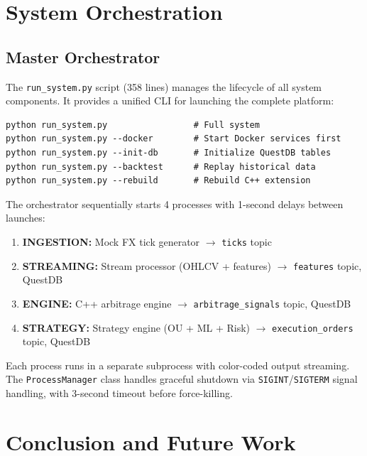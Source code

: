 \documentclass[letterpaper,11pt]{report}
\begin{document}
\chapter{System Orchestration}

\section{Master Orchestrator}

The \texttt{run\_system.py} script (358 lines) manages the lifecycle of all system components. It provides a unified CLI for launching the complete platform:

\begin{verbatim}
python run_system.py                 # Full system
python run_system.py --docker        # Start Docker services first
python run_system.py --init-db       # Initialize QuestDB tables
python run_system.py --backtest      # Replay historical data
python run_system.py --rebuild       # Rebuild C++ extension
\end{verbatim}

The orchestrator sequentially starts 4 processes with 1-second delays between launches:
\begin{enumerate}
    \item \textbf{INGESTION:} Mock FX tick generator $\to$ \texttt{ticks} topic
    \item \textbf{STREAMING:} Stream processor (OHLCV + features) $\to$ \texttt{features} topic, QuestDB
    \item \textbf{ENGINE:} C++ arbitrage engine $\to$ \texttt{arbitrage\_signals} topic, QuestDB
    \item \textbf{STRATEGY:} Strategy engine (OU + ML + Risk) $\to$ \texttt{execution\_orders} topic, QuestDB
\end{enumerate}

Each process runs in a separate subprocess with color-coded output streaming. The \texttt{ProcessManager} class handles graceful shutdown via \texttt{SIGINT}/\texttt{SIGTERM} signal handling, with 3-second timeout before force-killing.


\chapter{Conclusion and Future Work}
\end{document}
